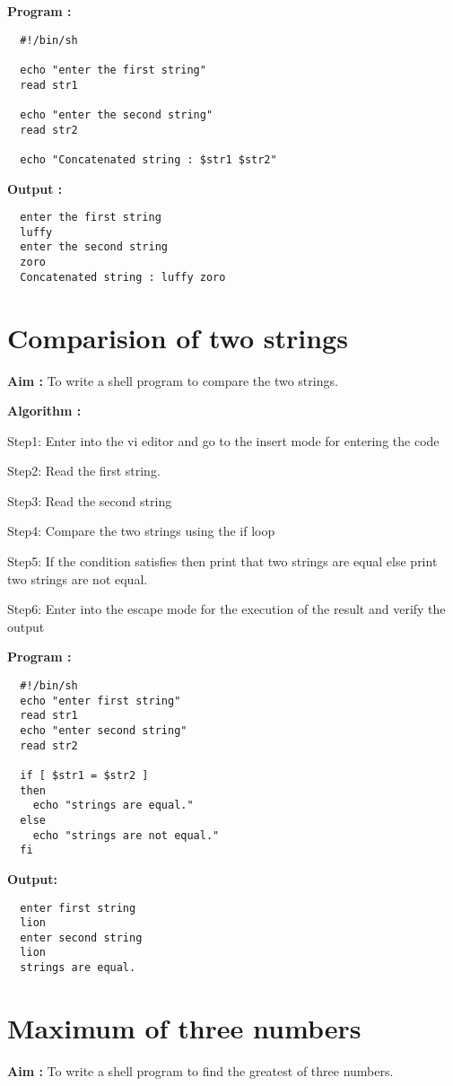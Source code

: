 \documentclass[journal,onecolumn]{IEEEtran}
\begin{document}
\textbf{Program :}
\begin{verbatim}
  #!/bin/sh

  echo "enter the first string"
  read str1
  
  echo "enter the second string"
  read str2
  
  echo "Concatenated string : $str1 $str2"
\end{verbatim}

\textbf{Output :}
\begin{verbatim}
  enter the first string
  luffy
  enter the second string
  zoro
  Concatenated string : luffy zoro
\end{verbatim}

\section{Comparision of two strings}
\textbf{Aim : } To write a shell program to compare the two strings.

\textbf{Algorithm : }
\begin{list}{}{}
  \item Step1: Enter into the vi editor and go to the insert mode for entering the code
  \item Step2: Read the first string.
  \item Step3: Read the second string
  \item Step4: Compare the two strings using the if loop
  \item Step5: If the condition satisfies then print that two strings are equal else print
        two strings are not equal.
  \item Step6: Enter into the escape mode for the execution of the result and verify the output
\end{list}

\textbf{Program : }
\begin{verbatim}
  #!/bin/sh
  echo "enter first string"
  read str1
  echo "enter second string"
  read str2

  if [ $str1 = $str2 ] 
  then
    echo "strings are equal."
  else
    echo "strings are not equal."
  fi
\end{verbatim}

\textbf{Output:}
\begin{verbatim}
  enter first string
  lion
  enter second string
  lion
  strings are equal.
\end{verbatim}


\section{Maximum of three numbers}
\textbf{Aim : } To write a shell program to find the greatest of three numbers.
\end{document}
